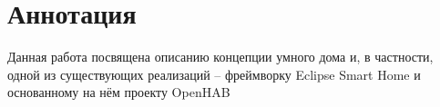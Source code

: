 \section*{Аннотация}

Данная работа посвящена описанию концепции умного дома и, в частности, одной из существующих реализаций -- фреймворку Eclipse Smart Home и основанному на нём проекту OpenHAB
